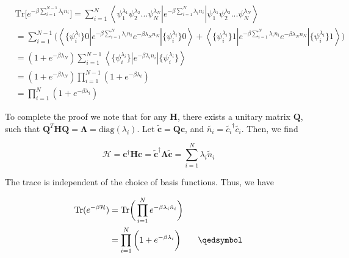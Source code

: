\begin{equation*}
\begin{split}
&\text{Tr} \big[ e^{-\beta \sum_{i=1}^{N-1} \lambda_{i} n_{i} } \big] = \sum_{i=1}^{N} \left\langle \psi_1^{\lambda_1} \psi_2^{\lambda_2} ... \psi_N^{\lambda_N} \left| e^{-\beta \sum_{i=1}^N \lambda_{i} n_{i}}  \right| \psi_1^{\lambda_1} \psi_2^{\lambda_2} ... \psi_N^{\lambda_N} \right\rangle \\
&= \sum_{i=1}^{N-1} \bigg( \left\langle \{\psi_i^{\lambda_i}\} 0 \left| e^{-\beta \sum_{i=1}^N \lambda_{i} n_{i}} e^{-\beta \lambda_{N} n_{N}} \right| \{\psi_i^{\lambda_i}\} 0 \right\rangle + \left\langle \{\psi_i^{\lambda_i}\} 1 \left| e^{-\beta \sum_{i=1}^N \lambda_{i} n_{i}} e^{-\beta \lambda_{N} n_{N}} \right| \{\psi_i^{\lambda_i}\} 1 \right\rangle \bigg) \\
&= (1 + e^{-\beta \lambda_{N} } ) \sum_{i=1}^{N-1} \left\langle \{\psi_i^{\lambda_i}\} \left| e^{-\beta \lambda_{i} n_{i}} \right| \{\psi_i^{\lambda_i}\} \right\rangle \\
&= (1 + e^{-\beta \lambda_{N} } ) \prod_{i=1}^{N-1} (1 + e^{-\beta \lambda_{i} } ) \\
&= \prod_{i=1}^{N} (1 + e^{-\beta \lambda_{i} } )
\end{split}
\end{equation*}

To complete the proof we note that for any $\bm H$, there exists a unitary matrix $\bm Q$, such that $\bm Q^T \bm H \bm Q = \bm \Lambda = \text{diag}(\lambda_{i})$. Let $\tilde{\bm c} = \bm Q \bm c$, and $\tilde{n_i} = \tilde{c_i}^\dagger \tilde{c_i}$. Then, we find

\begin{equation*}
\mathcal{H} = \bm c^\dagger \bm H \bm c = \bm \tilde{\bm c}^\dagger \bm \Lambda \tilde{\bm c} = \sum_{i=1}^N \lambda_{i} \tilde{n}_{i}
\end{equation*}

The trace is independent of the choice of basis functions. Thus, we have

\begin{equation*}
\begin{split}
\text{Tr} ( e^{-\beta \mathcal{H} } ) &= \text{Tr} \bigg( \prod_{i=1}^N e^{-\beta \lambda_{i} \tilde{n}_{i} } \bigg) \\
&= \prod_{i=1}^N \bigg( 1 + e^{-\beta \lambda_{i} } \bigg) \quad\quad \qedsymbol
\end{split}
\end{equation*}

